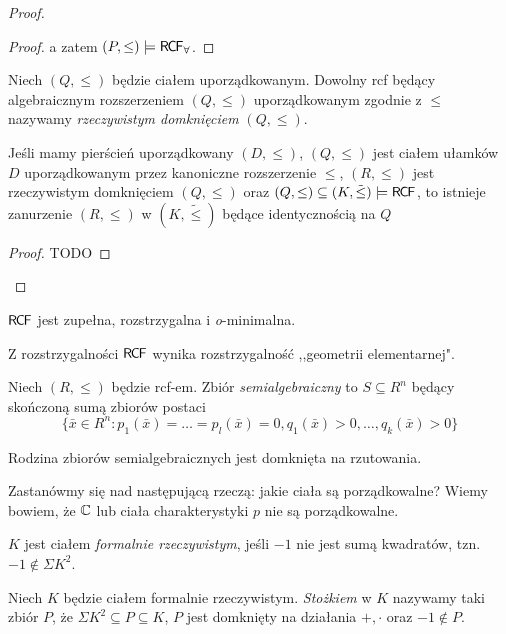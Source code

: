 \documentclass{article}
\begin{document}
\begin{proof}
\begin{proof}
		 a zatem $(P, \leq) \models \mathsf{R \mkern-1.7mu C \mkern-1.4mu F}_{\forall}$.
	\end{proof}
	\begin{df}
		 Niech $(Q, \leq)$ będzie ciałem uporządkowanym.
		 Dowolny rcf będący algebraicznym rozszerzeniem $(Q, \leq)$ uporządkowanym zgodnie z $ \leq$ nazywamy
		 \textit{rzeczywistym domknięciem} $ (Q, \leq)$.
	\end{df}
	\begin{lem}
		 Jeśli mamy pierścień uporządkowany $ (D, \leq)$,
		 $(Q, \leq)$ jest ciałem ułamków $D$ uporządkowanym przez kanoniczne rozszerzenie $\leq$,
		 $ (R, \leq)$ jest rzeczywistym domknięciem $ (Q, \leq)$
		 oraz $ (Q, \leq) \subseteq (K, \tilde{\leq}) \models \mathsf{R \mkern-1.7mu C \mkern-1.4mu F}$,
		 to istnieje zanurzenie $ (R, \leq)$ w $ (K, \tilde{\leq})$ będące identycznością na $ Q$
	\end{lem}
	\begin{proof}
		 TODO
	\end{proof}




\end{proof}

\begin{wn}
	$ \mathsf{R \mkern-1.7mu C \mkern-1.4mu F}$ jest zupełna, rozstrzygalna i \textit{o}-minimalna.
\end{wn}

\begin{uw}
	 Z rozstrzygalności $ \mathsf{R \mkern-1.7mu C \mkern-1.4mu F}$ wynika rozstrzygalność ,,geometrii elementarnej".
\end{uw}

\begin{df}
	 Niech $ (R, \leq)$ będzie rcf-em.
	 Zbiór \textit{semialgebraiczny} to $ S \subseteq R^n$ będący skończoną sumą zbiorów postaci
	 \[
		 \{\bar{x} \in R^n \colon p_1(\bar{x}) = \ldots = p_l(\bar{x}) = 0, q_1(\bar{x}) > 0, \ldots, q_k(\bar{x}) > 0 \}
	 \]
\end{df}

\begin{uw}
	 Rodzina zbiorów semialgebraicznych jest domknięta na rzutowania.
\end{uw}


Zastanówmy się nad następującą rzeczą: jakie ciała są porządkowalne?
Wiemy bowiem, że $ \mathbb{C}$ lub ciała charakterystyki $ p$ nie są porządkowalne.

\begin{df}
	 $ K$ jest ciałem \textit{formalnie rzeczywistym}, jeśli $ -1$ nie jest sumą kwadratów, tzn. $ -1 \not \in \Sigma K^2$.
\end{df}
\begin{df}
         Niech $ K$ będzie ciałem formalnie rzeczywistym.
         \textit{Stożkiem} w $ K$ nazywamy taki zbiór $P$,
	 że $\Sigma K^2 \subseteq P \subseteq K$, $P$ jest domknięty na działania $+, \cdot$ oraz $-1 \not \in P$.
\end{df}
\end{document}
